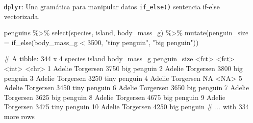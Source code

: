\documentclass[
  ignorenonframetext,
  aspectratio=169]{beamer}
\newenvironment{Shaded}{\begin{snugshade}}{\end{snugshade}}
\newcommand{\AttributeTok}[1]{\textcolor[rgb]{0.77,0.63,0.00}{#1}}
\newcommand{\DecValTok}[1]{\textcolor[rgb]{0.00,0.00,0.81}{#1}}
\newcommand{\FunctionTok}[1]{\textcolor[rgb]{0.00,0.00,0.00}{#1}}
\newcommand{\NormalTok}[1]{#1}
\newcommand{\SpecialCharTok}[1]{\textcolor[rgb]{0.00,0.00,0.00}{#1}}
\newcommand{\StringTok}[1]{\textcolor[rgb]{0.31,0.60,0.02}{#1}}
\let\oldverbatim\verbatim
\let\endoldverbatim\endverbatim
\renewenvironment{verbatim}{\tiny\oldverbatim}{\endoldverbatim}
\begin{document}
\begin{frame}[fragile]{\texttt{dplyr}: Una gramática para manipular
datos}
\protect\hypertarget{dplyr-una-gramuxe1tica-para-manipular-datos-4}{}
\texttt{if\_else()} sentencia if-else vectorizada.

\begin{Shaded}
\begin{Highlighting}[]
\NormalTok{penguins }\SpecialCharTok{\%\textgreater{}\%} \FunctionTok{select}\NormalTok{(species, island, body\_mass\_g) }\SpecialCharTok{\%\textgreater{}\%} 
  \FunctionTok{mutate}\NormalTok{(}\AttributeTok{penguin\_size =} \FunctionTok{if\_else}\NormalTok{(body\_mass\_g }\SpecialCharTok{\textless{}} \DecValTok{3500}\NormalTok{,}
                                \StringTok{"tiny penguin"}\NormalTok{,}
                                \StringTok{"big penguin"}\NormalTok{))}
\end{Highlighting}
\end{Shaded}

\begin{verbatim}
# A tibble: 344 x 4
   species island    body_mass_g penguin_size
   <fct>   <fct>           <int> <chr>       
 1 Adelie  Torgersen        3750 big penguin 
 2 Adelie  Torgersen        3800 big penguin 
 3 Adelie  Torgersen        3250 tiny penguin
 4 Adelie  Torgersen          NA <NA>        
 5 Adelie  Torgersen        3450 tiny penguin
 6 Adelie  Torgersen        3650 big penguin 
 7 Adelie  Torgersen        3625 big penguin 
 8 Adelie  Torgersen        4675 big penguin 
 9 Adelie  Torgersen        3475 tiny penguin
10 Adelie  Torgersen        4250 big penguin 
# ... with 334 more rows
\end{verbatim}
\end{frame}
\end{document}
